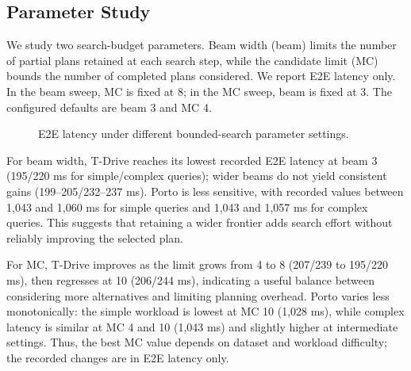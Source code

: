 
\subsection{Parameter Study}\label{sec:exp-parameters}

We study two search-budget parameters. Beam width (beam) limits the number of partial plans retained at each search step, while the candidate limit (MC) bounds the number of completed plans considered. We report E2E latency only. In the beam sweep, MC is fixed at 8; in the MC sweep, beam is fixed at 3. The configured defaults are beam 3 and MC 4.

\begin{figure}[!htbp]
\centering
\begin{minipage}[t]{0.31\textwidth}\centering
{}
\end{minipage}\hfill
\begin{minipage}[t]{0.31\textwidth}\centering
{}
\end{minipage}\hfill
\begin{minipage}[t]{0.31\textwidth}\centering
{}
\end{minipage}
\caption{E2E latency under different bounded-search parameter settings.}\label{fig:exp-parameters}
\end{figure}
\FloatBarrier

For beam width, T-Drive reaches its lowest recorded E2E latency at beam 3 (195/220 ms for simple/complex queries); wider beams do not yield consistent gains (199--205/232--237 ms). Porto is less sensitive, with recorded values between 1,043 and 1,060 ms for simple queries and 1,043 and 1,057 ms for complex queries. This suggests that retaining a wider frontier adds search effort without reliably improving the selected plan.

For MC, T-Drive improves as the limit grows from 4 to 8 (207/239 to 195/220 ms), then regresses at 10 (206/244 ms), indicating a useful balance between considering more alternatives and limiting planning overhead. Porto varies less monotonically: the simple workload is lowest at MC 10 (1,028 ms), while complex latency is similar at MC 4 and 10 (1,043 ms) and slightly higher at intermediate settings. Thus, the best MC value depends on dataset and workload difficulty; the recorded changes are in E2E latency only.

